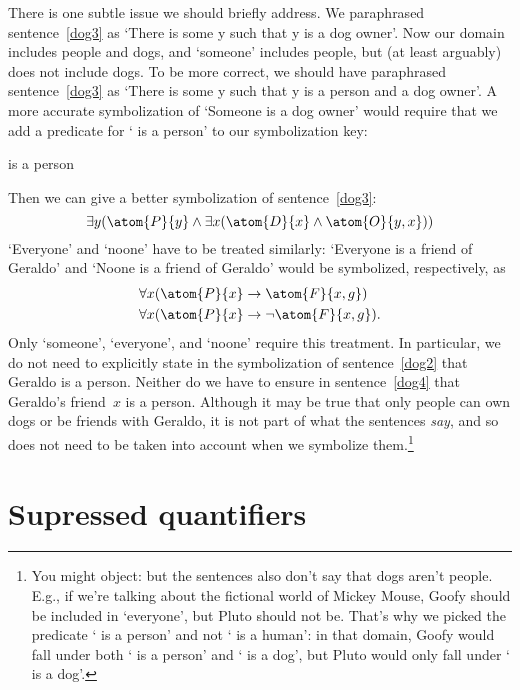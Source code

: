 There is one subtle issue we should briefly address. We paraphrased
sentence~\ref{dog3} as `There is some y such that y is a dog owner'.
Now our domain includes people and dogs, and `someone' includes
people, but (at least arguably) does not include dogs.  To be more
correct, we should have paraphrased sentence~\ref{dog3} as `There is
some y such that y is a person and a dog owner'. A more accurate
symbolization of `Someone is a dog owner' would require that we add a
predicate for `\blank{} is a person' to our symbolization key:
\begin{ekey}
	\item[\atom{P}{x}]  is a person
\end{ekey}
Then we can give a better symbolization of sentence~\ref{dog3}:
$$\exists y (\atom{P}{y} \eand \exists x(\atom{D}{x} \eand
\atom{O}{y,x}))$$
`Everyone' and `noone' have to be treated similarly: `Everyone
is a friend of Geraldo' and `Noone is a friend of Geraldo' would be
symbolized, respectively, as
\begin{align*}
	& \forall x(\atom{P}{x} \eif \atom{F}{x,g})\\
	& \forall x(\atom{P}{x} \eif \enot\atom{F}{x,g}).
\end{align*}
Only `someone', `everyone', and `noone' require this treatment. In
particular, we do not need to explicitly state in the symbolization of
sentence~\ref{dog2} that Geraldo is a person. Neither do we have to
ensure in sentence~\ref{dog4} that Geraldo's friend~$x$ is a person.
Although it may be true that only people can own dogs or be friends
with Geraldo, it is not part of what the sentences \emph{say}, and so
does not need to be taken into account when we symbolize
them.\footnote{You might object: but the sentences also don't say that
dogs aren't people. E.g., if we're talking about the fictional world
of Mickey Mouse, Goofy should be included in `everyone', but Pluto
should not be.  That's why we picked the predicate `\blank{} is a
person' and not `\blank{} is a human': in that domain, Goofy would
fall under both `\blank{} is a person' and `\blank{} is a dog', but
Pluto would only fall under `\blank{} is a dog'.}

\section{Supressed quantifiers}\label{ss:SuppQuant}

